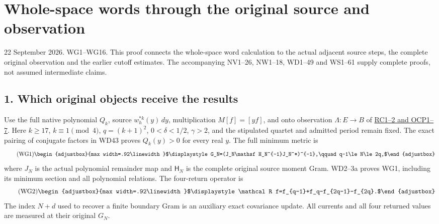\documentclass[11pt]{article}
\begin{document}
\clearpage
\section{Whole-space words through the original source and observation}\label{part1-whole-space-words-through-the-original-source-and-observation}

22 September 2026. WG1--WG16. This proof connects the whole-space word calculation to the actual adjacent source steps, the complete original observation and the earlier cutoff estimates. The accompanying NV1--26, NW1--18, WD1--49 and WS1--61 supply complete proofs, not assumed intermediate claims.

\subsection{1. Which original objects receive the results}\label{part1-which-original-objects-receive-the-results}

Use the full native polynomial \(Q_k\), source \(w_h^{*k}(y)\,dy\), multiplication \(M[f]=[yf]\), and onto observation \(\Lambda:E\to B\) of \href{https://github.com/KokunoYumeto/zeta-function-research-reader/blob/5c69161ca70ee187f41df0bfe786e8b6eebed422/workbenches/splitzero-tandem/continuations/20260922-current-effective-cutoff/CUTOFF_CURRENT_CONNECTION.md\#L7}{RC1--2 and OCP1--7}. Here \(k\ge17\), \(k\equiv1\pmod4\), \(q=(k+1)^2\), \(0<\delta<1/2\), \(\gamma>2\), and the stipulated quartet and admitted period remain fixed. The exact pairing of conjugate factors in WD43 proves \(Q_k(y)>0\) for every real \(y\). The full minimum metric is 
\begin{equation*}
\tag{WG1}
\begin{adjustbox}{max width=.92\linewidth}$\displaystyle G_N=(J_N\mathsf H_N^{-1}J_N^*)^{-1},\qquad
q-1\le N\le2q,$\end{adjustbox}
\end{equation*}
 where \(J_N\) is the actual polynomial remainder map and \(\mathsf H_N\) is the complete original source moment Gram. WD2--3a proves WG1, including its minimum section and all polynomial relations. The four-return operator is 
\begin{equation*}
\tag{WG2}
\begin{adjustbox}{max width=.92\linewidth}$\displaystyle \mathcal R f=f_{q-1}+f_q-f_{2q-1}-f_{2q}.$\end{adjustbox}
\end{equation*}
 The index \(N+d\) used to recover a finite boundary Gram is an auxiliary exact covariance update. All currents and all four returned values are measured at their original \(G_N\).
\end{document}
